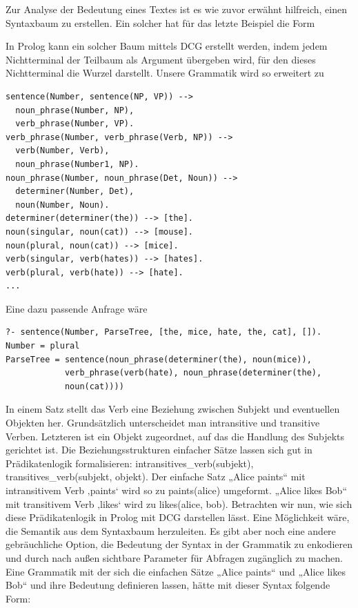 Zur Analyse der Bedeutung eines Textes ist es wie zuvor erwähnt hilfreich, einen Syntaxbaum zu erstellen.
Ein solcher hat für das letzte Beispiel die Form

In Prolog kann ein solcher Baum mittels DCG erstellt werden, indem jedem Nichtterminal der Teilbaum als Argument übergeben wird, für den dieses Nichtterminal die Wurzel darstellt.
Unsere Grammatik wird so erweitert zu

\begin{verbatim}
sentence(Number, sentence(NP, VP)) -->
  noun_phrase(Number, NP),
  verb_phrase(Number, VP).
verb_phrase(Number, verb_phrase(Verb, NP)) -->
  verb(Number, Verb),
  noun_phrase(Number1, NP).
noun_phrase(Number, noun_phrase(Det, Noun)) -->
  determiner(Number, Det),
  noun(Number, Noun).
determiner(determiner(the)) --> [the].
noun(singular, noun(cat)) --> [mouse].
noun(plural, noun(cat)) --> [mice].
verb(singular, verb(hates)) --> [hates].
verb(plural, verb(hate)) --> [hate].
...
\end{verbatim}

Eine dazu passende Anfrage wäre

\begin{verbatim}
?- sentence(Number, ParseTree, [the, mice, hate, the, cat], []).
Number = plural
ParseTree = sentence(noun_phrase(determiner(the), noun(mice)),
            verb_phrase(verb(hate), noun_phrase(determiner(the),
            noun(cat))))
\end{verbatim}

In einem Satz stellt das Verb eine Beziehung zwischen Subjekt und eventuellen Objekten her.
Grundsätzlich unterscheidet man intransitive und transitive Verben.
Letzteren ist ein Objekt zugeordnet, auf das die Handlung des Subjekts gerichtet ist.
Die Beziehungsstrukturen einfacher Sätze lassen sich gut in Prädikatenlogik formalisieren: intransitives\_verb(subjekt), transitives\_verb(subjekt, objekt).
Der einfache Satz „Alice paints“ mit intransitivem Verb ‚paints‘ wird so zu paints(alice) umgeformt.
„Alice likes Bob“ mit transitivem Verb ‚likes‘ wird zu likes(alice, bob).
Betrachten wir nun, wie sich diese Prädikatenlogik in Prolog mit DCG darstellen lässt.
Eine Möglichkeit wäre, die Semantik aus dem Syntaxbaum herzuleiten.
Es gibt aber noch eine andere gebräuchliche Option, die Bedeutung der Syntax in der Grammatik zu enkodieren und durch nach außen sichtbare Parameter für Abfragen zugänglich zu machen.
Eine Grammatik mit der sich die einfachen Sätze „Alice paints“ und „Alice likes Bob“ und ihre Bedeutung definieren lassen, hätte mit dieser Syntax folgende Form:

